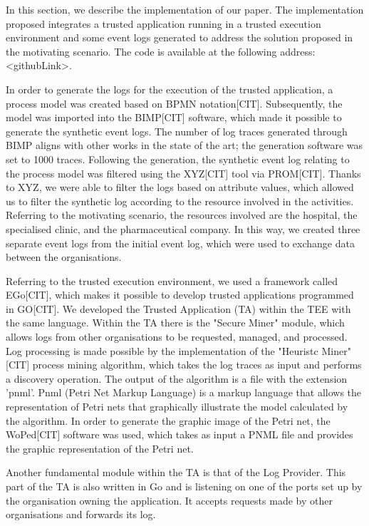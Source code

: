 In this section, we describe the implementation of our paper. The implementation proposed integrates a trusted application running in a
trusted execution environment and some event logs generated to address the solution proposed in the motivating scenario. The code is available at the following address: <githubLink>.

In order to generate the logs for the execution of the trusted application, a process model was created based on BPMN notation[CIT]. Subsequently, the model was imported into the BIMP[CIT] software, which made it possible to generate the synthetic event logs. The number of log traces generated through BIMP aligns with other works in the state of the art; the generation software was set to 1000 traces. Following the generation, the synthetic event log relating to the process model was filtered using the XYZ[CIT] tool via PROM[CIT]. Thanks to XYZ, we were able to filter the logs based on attribute values, which allowed us to filter the synthetic log according to the resource involved in the activities. Referring to the motivating scenario, the resources involved are the hospital, the specialised clinic, and the pharmaceutical company. In this way, we created three separate event logs from the initial event log, which were used to exchange data between the organisations.

Referring to the trusted execution environment, we used a framework called EGo[CIT], which makes it possible to develop trusted applications programmed in GO[CIT]. We developed the Trusted Application (TA) within the TEE with the same language. Within the TA there is the "Secure Miner" module, which allows logs from other organisations to be requested, managed, and processed. Log processing is made possible by the implementation of the "Heuristc Miner"[CIT] process mining algorithm, which takes the log traces as input and performs a discovery operation. The output of the algorithm is a file with the extension 'pnml'. Pnml (Petri Net Markup Language) is a markup language that allows the representation of Petri nets that graphically illustrate the model calculated by the algorithm. In order to generate the graphic image of the Petri net, the WoPed[CIT] software was used, which takes as input a PNML file and provides the graphic representation of the Petri net. 

Another fundamental module within the TA is that of the Log Provider. This part of the TA is also written in Go and is listening on one of the ports set up by the organisation owning the application. It accepts requests made by other organisations and forwards its log. 
